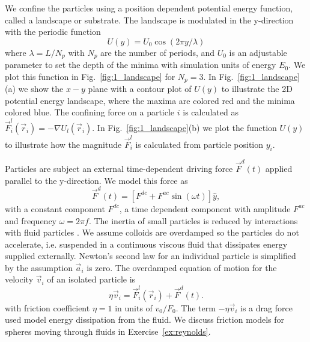 \documentclass[twocolumn,showpacs,preprintnumbers,amsmath,amssymb,aps,prb]{revtex4}
\begin{document}
We confine the particles using a position dependent 
potential energy function, called a landscape or substrate.
The landscape is modulated in the y-direction
with the periodic function 
 \begin{equation}
   U(y) = U_0 \cos{(2 \pi y / \lambda)}
     \label{eq:ysubstrate}
\end{equation}
 where $\lambda=L/N_p$ with $N_p$ are the number of periods,
 and $U_0$ is an adjustable parameter
 to set the depth of the minima
 with simulation units of energy $E_0$. 
 We plot this function in 
 Fig.~\ref{fig:1_landscape}
 for $N_p = 3$. 
 In Fig.~\ref{fig:1_landscape}(a) we show 
 the $x-y$ plane with a contour plot of $U(y)$ 
 to illustrate
 the 2D potential energy landscape,
 where 
 the maxima are colored red and the minima colored blue.
 The confining force on a particle $i$
 is calculated as 
 $\vec{F}^{l}_i(\vec{r}_i) = -\nabla U_l(\vec{r}_i)$.
 In Fig.~\ref{fig:1_landscape}(b) we plot the function
 $U(y)$ to illustrate how the magnitude
 $\vec{F}^{l}_i$ is calculated from particle position $y_i$.  
 
 Particles are subject an external time-dependent driving force
$\vec{F}^{d}(t)$
applied parallel to the y-direction.
We model this force as
\begin{equation}
  \vec{F}^{d}(t) = [F^{dc} + F^{ac} \sin(\omega t)] \hat{y},
    \label{eq:drive}
\end{equation}
with 
a constant component $F^{dc}$,
a time dependent component with amplitude $F^{ac}$
and frequency $\omega = 2 \pi f$.
The inertia of 
small particles is reduced by interactions
with fluid particles \cite{Purcell1977}.
We assume 
colloids are
overdamped
so the particles do not accelerate,
i.e. suspended in a continuous viscous fluid
that dissipates energy supplied externally. 
Newton's second law for an individual particle
is simplified
by the assumption $\vec{a}_i$ is zero. 
The overdamped equation of motion for
the velocity $\vec{v}_i$ of 
an isolated particle is
\begin{equation}
  \eta \vec{v}_i = \vec{F}^l_{i}(\vec{r}_i) + \vec{F}^{d}(t).
    \label{eq:motion}
\end{equation}
with friction coefficient $\eta = 1$ in units of $v_0 / F_0$. 
The term $-\eta \vec{v}_i$
is a drag force used model 
energy dissipation from the fluid. 
We discuss friction models for
spheres moving through fluids in 
Exercise~\ref{ex:reynolds}. 
\end{document}
